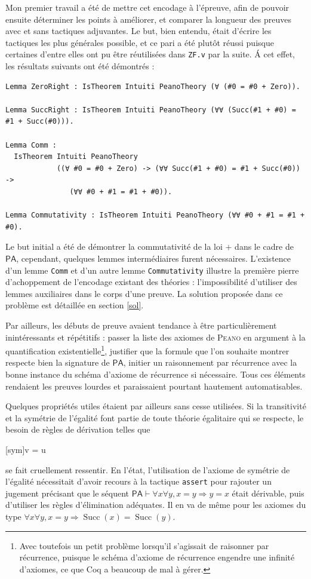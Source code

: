\documentclass[a4paper]{article}
\DeclareMathOperator{\Succ}{\mathrm{Succ}}
\newcommand{\PA}{\mathsf{PA}}
\theoremstyle{remark}
\theoremstyle{remark}
\theoremstyle{remark}
\theoremstyle{definition}
\theoremstyle{definition}
\theoremstyle{definition}
\begin{document}
Mon premier travail a été de mettre cet encodage à l'épreuve, afin de pouvoir ensuite déterminer les points à améliorer, et comparer la longueur des preuves avec et sans tactiques adjuvantes. Le but, bien entendu, était d'écrire les tactiques les plus générales possible, et ce pari a été plutôt réussi puisque certaines d'entre elles ont pu être réutilisées dans \verb+ZF.v+ par la suite. \'A cet effet, les résultats suivants ont été démontrés :
\begin{verbatim}
Lemma ZeroRight : IsTheorem Intuiti PeanoTheory (∀ (#0 = #0 + Zero)).

Lemma SuccRight : IsTheorem Intuiti PeanoTheory (∀∀ (Succ(#1 + #0) = #1 + Succ(#0))).

Lemma Comm :
  IsTheorem Intuiti PeanoTheory
            ((∀ #0 = #0 + Zero) -> (∀∀ Succ(#1 + #0) = #1 + Succ(#0)) ->
               (∀∀ #0 + #1 = #1 + #0)).

Lemma Commutativity : IsTheorem Intuiti PeanoTheory (∀∀ #0 + #1 = #1 + #0).
\end{verbatim}
Le but initial a été de démontrer la commutativité de la loi $+$ dans le cadre de $\PA$, cependant, quelques lemmes intermédiaires furent nécessaires. L'existence d'un lemme \verb+Comm+ et d'un autre lemme \verb+Commutativity+ illustre la première pierre d'achoppement de l'encodage existant des théories : l'impossibilité d'utiliser des lemmes auxiliaires dans le corps d'une preuve. La solution proposée dans ce problème est détaillée en section \ref{sol}.

Par ailleurs, les débuts de preuve avaient tendance à être particulièrement inintéressants et répétitifs : passer la liste des axiomes de \textsc{Peano} en argument à la quantification existentielle\footnote{Avec toutefois un petit problème lorsqu'il s'agissait de raisonner par récurrence, puisque le schéma d'axiome de récurrence engendre une infinité d'axiomes, ce que Coq a beaucoup de mal à gérer.}, justifier que la formule que l'on souhaite montrer respecte bien la signature de $\PA$, initier un raisonnement par récurrence avec la bonne instance du schéma d'axiome de récurrence si nécessaire. Tous ces éléments rendaient les preuves lourdes et paraissaient pourtant hautement automatisables.

Quelques propriétés utiles étaient par ailleurs sans cesse utilisées. Si la transitivité et la symétrie de l'égalité font partie de toute théorie égalitaire qui se respecte, le besoin de règles de dérivation telles que \begin{prooftree*}
[sym]{\Gamma \vdash v = u}
\end{prooftree*} se fait cruellement ressentir. En l'état, l'utilisation de l'axiome de symétrie de l'égalité nécessitait d'avoir recours à la tactique \verb+assert+ pour rajouter un jugement précisant que le séquent $\PA \vdash \forall x \forall y, x = y \Rightarrow y = x$ était dérivable, puis d'utiliser les règles d'élimination adéquates. Il en va de même pour les axiomes du type $\forall x \forall y, x = y \Rightarrow \Succ (x) = \Succ (y)$.
\end{document}
